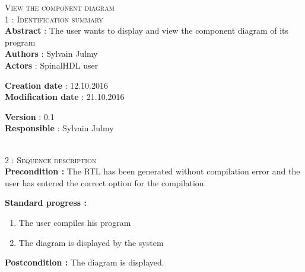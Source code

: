 \begin{flushleft}
    \textsc{\huge View the component diagram}\\[0.5cm]

    \BlackLine
    \textsc{\Large 1 : Identification summary}\\[0.3cm]

        \textbf{\large Abstract} : The user wants to display and view the component diagram of its program \\[0.1cm]

        \textbf{\large Authors} : Sylvain Julmy \\[0.3cm]			

        \textbf{\large Actors} : SpinalHDL user \\[0.1cm]	
    \begin{minipage}{0.40\textwidth}
        \begin{flushleft}	
            \textbf{\large Creation date} : 12.10.2016 \\[0.1cm]

            \textbf{\large Modification date} : 21.10.2016 \\[0.1cm]
        \end{flushleft}
    \end{minipage}
    \begin{minipage}{0.40\textwidth}
        \begin{flushleft}
            \textbf{\large Version} : 0.1 \\[0.1cm]

            \textbf{\large Responsible} : Sylvain Julmy \\[0.1cm]
        \end{flushleft}
    \end{minipage}
    \\[0.5cm]
    \BlackLine
    \textsc{\Large 2 : Sequence description}\\[0.3cm]

    \textbf{\large Precondition :} The RTL has been generated without compilation error and the user has entered the correct option for the compilation.

    \textbf{\large  Standard progress :}
    \begin{enumerate}[nosep]
        \item The user compiles his program
        \item The diagram is displayed by the system
    \end{enumerate}

    \textbf{\large Postcondition :} The diagram is displayed.


\end{flushleft}
